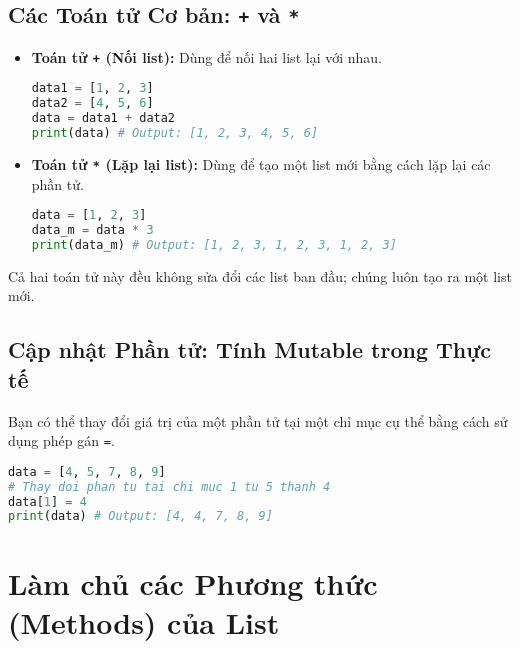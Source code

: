 \documentclass[11pt]{article}
\begin{document}
\subsection{Các Toán tử Cơ bản: \texttt{+} và \texttt{*}}
\begin{itemize}
    \item \textbf{Toán tử \texttt{+} (Nối list):} Dùng để nối hai list lại với nhau.
    \begin{lstlisting}[language=Python]
data1 = [1, 2, 3]
data2 = [4, 5, 6]
data = data1 + data2
print(data) # Output: [1, 2, 3, 4, 5, 6]
    \end{lstlisting}
    \item \textbf{Toán tử \texttt{*} (Lặp lại list):} Dùng để tạo một list mới bằng cách lặp lại các phần tử.
    \begin{lstlisting}[language=Python]
data = [1, 2, 3]
data_m = data * 3
print(data_m) # Output: [1, 2, 3, 1, 2, 3, 1, 2, 3]
    \end{lstlisting}
\end{itemize}
Cả hai toán tử này đều không sửa đổi các list ban đầu; chúng luôn tạo ra một list mới.

\subsection{Cập nhật Phần tử: Tính Mutable trong Thực tế}
Bạn có thể thay đổi giá trị của một phần tử tại một chỉ mục cụ thể bằng cách sử dụng phép gán \texttt{=}.
\begin{lstlisting}[language=Python]
data = [4, 5, 7, 8, 9]
# Thay doi phan tu tai chi muc 1 tu 5 thanh 4
data[1] = 4
print(data) # Output: [4, 4, 7, 8, 9]
\end{lstlisting}

\section{Làm chủ các Phương thức (Methods) của List}
\end{document}
